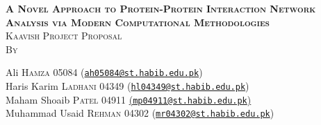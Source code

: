 \begin{titlepage}

\newcommand{\HRule}{\rule{\linewidth}{0.5mm}} %

\center %
 

\textsc{\LARGE \bf A Novel Approach to Protein-Protein Interaction 
Network Analysis via Modern Computational 
Methodologies}\\[1.0cm] %
\textsc{\large Kaavish Project Proposal}\\[0.5cm]
\textsc{\large By}\\[0.5cm] 


\begin{minipage}{0.8\textwidth} %
\begin{center} \large
Ali \textsc{Hamza} 05084 (\href{mailto:ah05084@st.habib.edu.pk}{\texttt{ah05084@st.habib.edu.pk}}) \\
Haris Karim \textsc{Ladhani} 04349 (\href{mailto:hl04349@st.habib.edu.pk}{\texttt{hl04349@st.habib.edu.pk}})\\
Maham Shoaib \textsc{Patel} 04911 \href{mailto: (mp04911@st.habib.edu.pk)}{(\texttt{mp04911@st.habib.edu.pk})}\\
Muhammad Usaid \textsc{Rehman} 04302 (\href{mailto:mr04302@st.habib.edu.pk}{\texttt{mr04302@st.habib.edu.pk}}) \\
\end{center}
\end{minipage}
~
\begin{minipage}{0.4\textwidth}
\end{minipage}\\[1cm]



\end{titlepage}
